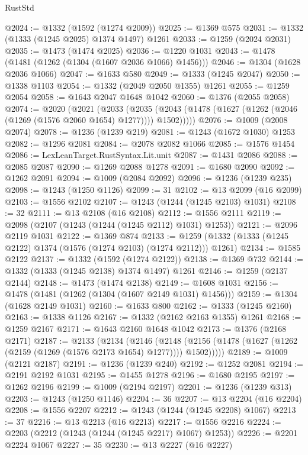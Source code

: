 \begin{lexlean}{RustStd}
\begin{coremodule}
@2024 := @1332 (@1592 (@1274 @2009))
@2025 := @1369 @575
@2031 := @1332 (@1333 (@1245 @2025) @1374 @1497) @1261
@2033 := @1259 (@2024 @2031)
@2035 := @1473 (@1474 @2025)
@2036 := @1220 @1031
@2043 := @1478 (@1481 (@1262 (@1304 (@1607 @2036 @1066) @1456)))
@2046 := @1304 (@1628 @2036 @1066)
@2047 := @1633 @580
@2049 := @1333 (@1245 @2047)
@2050 := @1338 @1103
@2054 := @1332 (@2049 @2050 @1355) @1261
@2055 := @1259 @2054
@2058 := @1643 @2047 @1648 @1042
@2060 := @1376 (@2055 @2058)
@2074 := @2020
    (@2021
      (@2033
        (@2035 (@2043 (@1478 (@1627 (@1262 (@2046 (@1269 (@1576 @2060 @1654) @1277)))) @1502)))))
@2076 := @1009 (@2008 @2074)
@2078 := @1236 (@1239 @219)
@2081 := @1243 (@1672 @1030) @1253
@2082 := @1296 @2081
@2084 := @2078 @2082 @1066
@2085 := @1576 @1454
@2086 := LexLeanTarget.RustSyntax.Lit.unit
@2087 := @1431 @2086
@2088 := @2085 @2087
@2090 := @1269 @2088 @1278
@2091 := @1680 @2090
@2092 := @1262 @2091
@2094 := @1009 (@2084 @2092)
@2096 := @1236 (@1239 @235)
@2098 := @1243 (@1250 @1126)
@2099 := 31
@2102 := @13 @2099 (@16 @2099)
@2103 := @1556 @2102
@2107 := @1243 (@1244 (@1245 @2103) @1031)
@2108 := 32
@2111 := @13 @2108 (@16 @2108)
@2112 := @1556 @2111
@2119 := @2098 (@2107 (@1243 (@1244 (@1245 @2112) @1031) @1253))
@2121 := @2096 @2119 @1031
@2122 := @1369 @874
@2133 := @1259 (@1332 (@1333 (@1245 @2122) @1374 (@1576 (@1274 @2103) (@1274 @2112))) @1261)
@2134 := @1585 @2122
@2137 := @1332 (@1592 (@1274 @2122))
@2138 := @1369 @732
@2144 := @1332 (@1333 (@1245 @2138) @1374 @1497) @1261
@2146 := @1259 (@2137 @2144)
@2148 := @1473 (@1474 @2138)
@2149 := @1608 @1031
@2156 := @1478 (@1481 (@1262 (@1304 (@1607 @2149 @1031) @1456)))
@2159 := @1304 (@1628 @2149 @1031)
@2160 := @1633 @800
@2162 := @1333 (@1245 @2160)
@2163 := @1338 @1126
@2167 := @1332 (@2162 @2163 @1355) @1261
@2168 := @1259 @2167
@2171 := @1643 @2160 @1648 @1042
@2173 := @1376 (@2168 @2171)
@2187 := @2133
    (@2134
      (@2146
        (@2148 (@2156 (@1478 (@1627 (@1262 (@2159 (@1269 (@1576 @2173 @1654) @1277)))) @1502)))))
@2189 := @1009 (@2121 @2187)
@2191 := @1236 (@1239 @240)
@2192 := @1252 @2081
@2194 := @2191 @2192 @1031
@2195 := @1455 @1278
@2196 := @1680 @2195
@2197 := @1262 @2196
@2199 := @1009 (@2194 @2197)
@2201 := @1236 (@1239 @313)
@2203 := @1243 (@1250 @1146)
@2204 := 36
@2207 := @13 @2204 (@16 @2204)
@2208 := @1556 @2207
@2212 := @1243 (@1244 (@1245 @2208) @1067)
@2213 := 37
@2216 := @13 @2213 (@16 @2213)
@2217 := @1556 @2216
@2224 := @2203 (@2212 (@1243 (@1244 (@1245 @2217) @1067) @1253))
@2226 := @2201 @2224 @1067
@2227 := 35
@2230 := @13 @2227 (@16 @2227)

\end{coremodule}
\end{lexlean}
